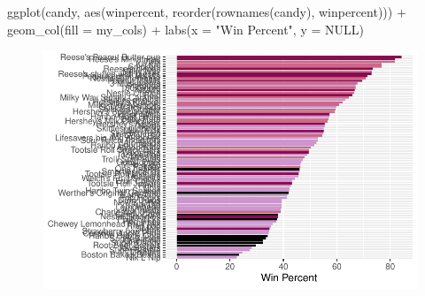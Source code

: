 \documentclass[
  letterpaper,
  DIV=11,
  numbers=noendperiod]{scrartcl}
\newenvironment{Shaded}{\begin{snugshade}}{\end{snugshade}}
\newcommand{\AttributeTok}[1]{\textcolor[rgb]{0.40,0.45,0.13}{#1}}
\newcommand{\CommentTok}[1]{\textcolor[rgb]{0.37,0.37,0.37}{#1}}
\newcommand{\ConstantTok}[1]{\textcolor[rgb]{0.56,0.35,0.01}{#1}}
\newcommand{\FunctionTok}[1]{\textcolor[rgb]{0.28,0.35,0.67}{#1}}
\newcommand{\NormalTok}[1]{\textcolor[rgb]{0.00,0.23,0.31}{#1}}
\newcommand{\OtherTok}[1]{\textcolor[rgb]{0.00,0.23,0.31}{#1}}
\newcommand{\SpecialCharTok}[1]{\textcolor[rgb]{0.37,0.37,0.37}{#1}}
\newcommand{\StringTok}[1]{\textcolor[rgb]{0.13,0.47,0.30}{#1}}
\begin{document}
\begin{Shaded}
\end{Shaded}

\begin{Shaded}
\begin{Highlighting}[]
\FunctionTok{ggplot}\NormalTok{(candy, }\FunctionTok{aes}\NormalTok{(winpercent, }\FunctionTok{reorder}\NormalTok{(}\FunctionTok{rownames}\NormalTok{(candy), winpercent))) }\SpecialCharTok{+} 
  \FunctionTok{geom\_col}\NormalTok{(}\AttributeTok{fill =}\NormalTok{ my\_cols) }\SpecialCharTok{+} 
  \FunctionTok{labs}\NormalTok{(}\AttributeTok{x =} \StringTok{"Win Percent"}\NormalTok{, }\AttributeTok{y =} \ConstantTok{NULL}\NormalTok{)}
\end{Highlighting}
\end{Shaded}

\begin{figure}[H]

{\centering \includegraphics{halloween-mini-project_files/figure-pdf/unnamed-chunk-18-1.pdf}

}

\end{figure}
\end{document}
